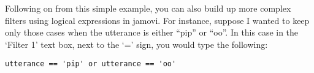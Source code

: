 Following on from this simple example, you can also build up more complex filters using logical expressions in jamovi. For instance, suppose I wanted to keep only those cases when the utterance is either ``pip'' or ``oo''. In this case in the `Filter 1' text box, next to the `=' sign, you would type the following:
\begin{verbatim}
utterance == 'pip' or utterance == 'oo'
\end{verbatim}


\begin{comment}
 - don't think this next section is required in jamovi



\section{Sorting, flipping and merging data~\label{sec:sort}}

In this section I discuss a few useful operations that I feel are loosely related to one another: sorting a vector, sorting a data frame, binding two or more vectors together into a data frame (or matrix), and flipping a data frame (or matrix) on its side. They're all fairly straightforward tasks, at least in comparison to some of the more obnoxious data handling problems that turn up in real life.




\section{Reshaping a data frame\label{sec:reshape}}




\subsection{Long form and wide form data}
The most common format in which you might obtain data is as a ``case by variable'' layout, commonly known as the \keyterm{wide form} of the data. 

\begin{verbatim}
> @usr{load("repeated.Rdata")}
> @usr{who()}
   -- Name --   -- Class --   -- Size --
   choice       data.frame    4 x 10    
   drugs        data.frame    10 x 8    
\end{verbatim}


\end{comment}
